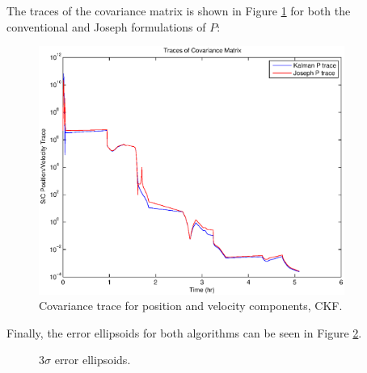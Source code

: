 \documentclass[]{aiaa-tc}%
\begin{document}
	The traces of the covariance matrix is shown in Figure \ref{fig:CKF_Cov} for both the conventional and Joseph formulations of $P$:

	\begin{figure}[H]
		\centering
		\includegraphics[width = 10cm]{CKF_Cov.eps}
		\caption{Covariance trace for position and velocity components, CKF. }
		\label{fig:CKF_Cov}
	\end{figure}	

	Finally, the error ellipsoids for both algorithms can be seen in Figure \ref{fig:ErrorEllipsoids}.

	\begin{figure}[H]
		\centering
		\caption{3$\sigma$ error ellipsoids. }
		\label{fig:ErrorEllipsoids}
	\end{figure}	
\end{document}
